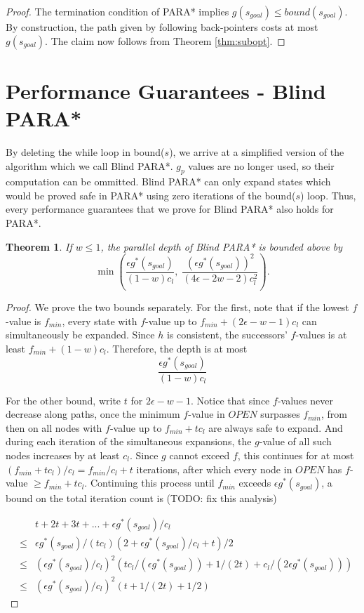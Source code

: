\documentclass[letterpaper]{article}
\newtheorem{thm}{Theorem}
\begin{document}
\begin{proof}
The termination condition of PARA* implies $g(s_{goal}) \le bound(s_{goal})$. By construction, the path given by following back-pointers costs at most $g(s_{goal})$. The claim now follows from Theorem \ref{thm:subopt}.
\end{proof}

\section{Performance Guarantees - Blind PARA*}

By deleting the while loop in bound($s$), we arrive at a simplified version of the algorithm which we call Blind PARA*. $g_p$ values are no longer used, so their computation can be ommitted. Blind PARA* can only expand states which would be proved safe in PARA* using zero iterations of the bound($s$) loop. Thus, every performance guarantees that we prove for Blind PARA* also holds for PARA*. 

\begin{thm}
\label{thm:depth}
If $w \le 1$, the parallel depth of Blind PARA* is bounded above by
\[\min\left(\frac{\epsilon g^*(s_{goal})}{(1-w)c_l},\;
\frac{\left(\epsilon g^*(s_{goal})\right)^2 }{(4\epsilon-2w-2)c_l^2}\right).\]
\end{thm}

\begin{proof}
We prove the two bounds separately. For the first, note that if the lowest $f$-value is $f_{min}$, every state with $f$-value up to $f_{min} + (2\epsilon-w-1)c_l$ can simultaneously be expanded. Since $h$ is consistent, the successors' $f$-values is at least $f_{min} + (1-w)c_l$. Therefore, the depth is at most
\[\frac{\epsilon g^*(s_{goal})}{(1-w)c_l}\]

For the other bound, write $t$ for $2\epsilon-w-1$. Notice that since $f$-values never decrease along paths, once the minimum $f$-value in $OPEN$ surpasses $f_{min}$, from then on all nodes with $f$-value up to $f_{min} + tc_l$ are always safe to expand. And during each iteration of the simultaneous expansions, the $g$-value of all such nodes increases by at least $c_l$. Since $g$ cannot exceed $f$, this continues for at most $(f_{min} + tc_l) / c_l = f_{min}/c_l + t$ iterations, after which every node in $OPEN$ has $f$-value $\ge f_{min} + tc_l$. Continuing this process until $f_{min}$ exceeds $\epsilon g^*(s_{goal})$, a bound on the total iteration count is (TODO: fix this analysis)

\begin{eqnarray*}
&&t + 2t + 3t + ... + \epsilon g^*(s_{goal})/c_l
\\&\le& \epsilon  g^*(s_{goal})/(tc_l)(2+\epsilon g^*(s_{goal})/c_l+t)/2
\\&\le& (\epsilon g^*(s_{goal})/c_l )^2 (tc_l/(\epsilon g^*(s_{goal})) + 1/(2t) + c_l/(2\epsilon g^*(s_{goal})))
\\&\le& (\epsilon g^*(s_{goal})/c_l )^2 (t + 1/(2t) + 1/2)
\end{eqnarray*}
\end{proof}
\end{document}
